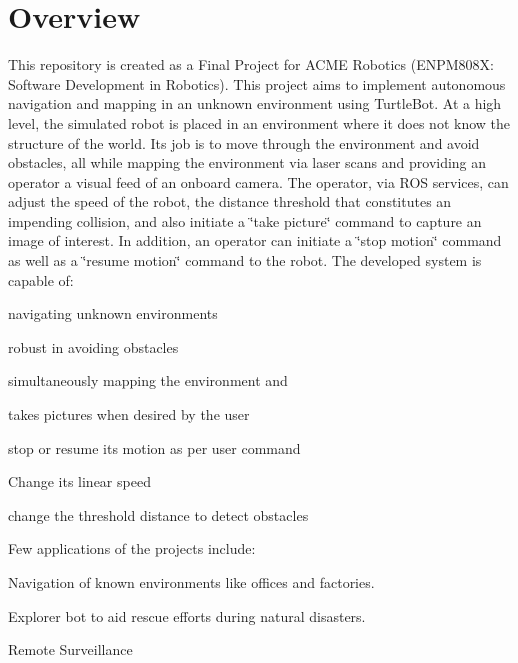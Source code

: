 \href{https://travis-ci.org/ysshah95/Pytheas}{\tt } \href{https://coveralls.io/github/ysshah95/Pytheas?branch=master}{\tt } \href{https://opensource.org/licenses/BSD-3-Clause}{\tt }

\section*{Overview}

This repository is created as a Final Project for A\+C\+ME Robotics (E\+N\+P\+M808X\+: Software Development in Robotics). This project aims to implement autonomous navigation and mapping in an unknown environment using Turtle\+Bot. At a high level, the simulated robot is placed in an environment where it does not know the structure of the world. Its job is to move through the environment and avoid obstacles, all while mapping the environment via laser scans and providing an operator a visual feed of an onboard camera. The operator, via R\+OS services, can adjust the speed of the robot, the distance threshold that constitutes an impending collision, and also initiate a \char`\"{}take picture\char`\"{} command to capture an image of interest. In addition, an operator can initiate a \char`\"{}stop motion\char`\"{} command as well as a \char`\"{}resume motion\char`\"{} command to the robot. The developed system is capable of\+:


\begin{DoxyItemize}
\item navigating unknown environments
\item robust in avoiding obstacles
\item simultaneously mapping the environment and
\item takes pictures when desired by the user
\item stop or resume its motion as per user command
\item Change its linear speed
\item change the threshold distance to detect obstacles
\end{DoxyItemize}

Few applications of the projects include\+:
\begin{DoxyItemize}
\item Navigation of known environments like offices and factories.
\item Explorer bot to aid rescue efforts during natural disasters.
\item Remote Surveillance
\end{DoxyItemize}

